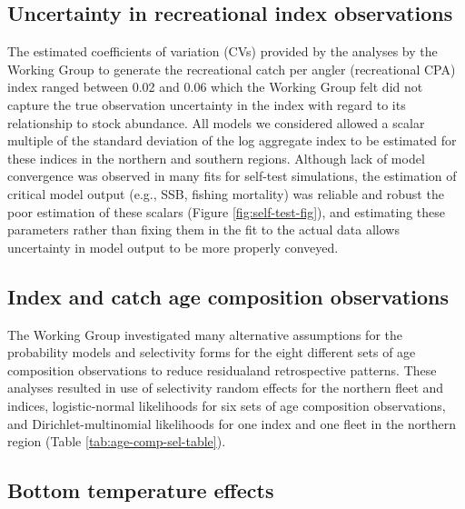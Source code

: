 \documentclass[
]{article}
\begin{document}
\hypertarget{uncertainty-in-recreational-index-observations}{%
\subsection*{Uncertainty in recreational index observations}\label{uncertainty-in-recreational-index-observations}}

The estimated coefficients of variation (CVs) provided by the analyses by the Working Group to generate the recreational catch per angler (recreational CPA) index ranged between 0.02 and 0.06 which the Working Group felt did not capture the true observation uncertainty in the index with regard to its relationship to stock abundance. All models we considered allowed a scalar multiple of the standard deviation of the log aggregate index to be estimated for these indices in the northern and southern regions. Although lack of model convergence was observed in many fits for self-test simulations, the estimation of critical model output (e.g., SSB, fishing mortality) was reliable and robust the poor estimation of these scalars (Figure \ref{fig:self-test-fig}), and estimating these parameters rather than fixing them in the fit to the actual data allows uncertainty in model output to be more properly conveyed.

\hypertarget{index-and-catch-age-composition-observations}{%
\subsection*{Index and catch age composition observations}\label{index-and-catch-age-composition-observations}}

The Working Group investigated many alternative assumptions for the probability models and selectivity forms for the eight different sets of age composition observations to reduce residualand retrospective patterns. These analyses resulted in use of selectivity random effects for the northern fleet and indices, logistic-normal likelihoods for six sets of age composition observations, and Dirichlet-multinomial likelihoods for one index and one fleet in the northern region (Table \ref{tab:age-comp-sel-table}).

\hypertarget{bottom-temperature-effects}{%
\subsection*{Bottom temperature effects}\label{bottom-temperature-effects}}
\end{document}
